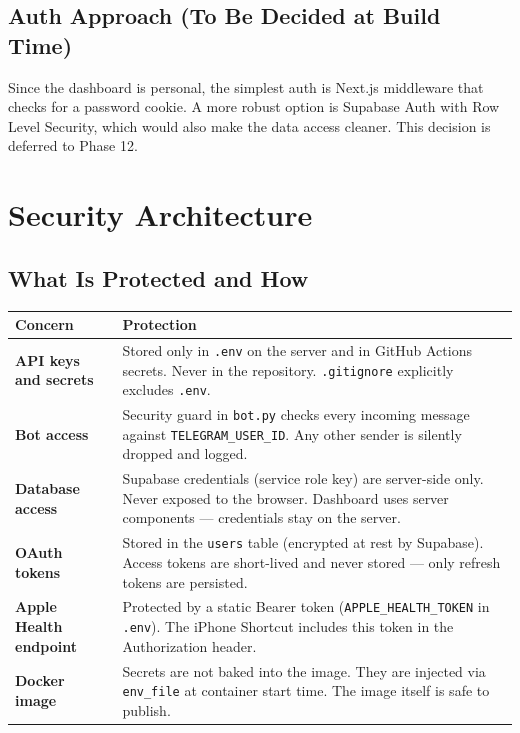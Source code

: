 \documentclass[12pt, a4paper]{article}
\begin{document}
\subsection{Auth Approach (To Be Decided at Build Time)}

Since the dashboard is personal, the simplest auth is Next.js middleware that checks for a password cookie. A more robust option is Supabase Auth with Row Level Security, which would also make the data access cleaner. This decision is deferred to Phase 12.

\section{Security Architecture}

\subsection{What Is Protected and How}

\begin{longtable}{>{\bfseries}p{4cm} p{10cm}}
\toprule
Concern & Protection \\
\midrule
API keys and secrets & Stored only in \texttt{.env} on the server and in GitHub Actions secrets. Never in the repository. \texttt{.gitignore} explicitly excludes \texttt{.env}. \\
\addlinespace
Bot access & Security guard in \texttt{bot.py} checks every incoming message against \texttt{TELEGRAM\_USER\_ID}. Any other sender is silently dropped and logged. \\
\addlinespace
Database access & Supabase credentials (service role key) are server-side only. Never exposed to the browser. Dashboard uses server components --- credentials stay on the server. \\
\addlinespace
OAuth tokens & Stored in the \texttt{users} table (encrypted at rest by Supabase). Access tokens are short-lived and never stored --- only refresh tokens are persisted. \\
\addlinespace
Apple Health endpoint & Protected by a static Bearer token (\texttt{APPLE\_HEALTH\_TOKEN} in \texttt{.env}). The iPhone Shortcut includes this token in the Authorization header. \\
\addlinespace
Docker image & Secrets are not baked into the image. They are injected via \texttt{env\_file} at container start time. The image itself is safe to publish. \\
\bottomrule
\end{longtable}
\end{document}
